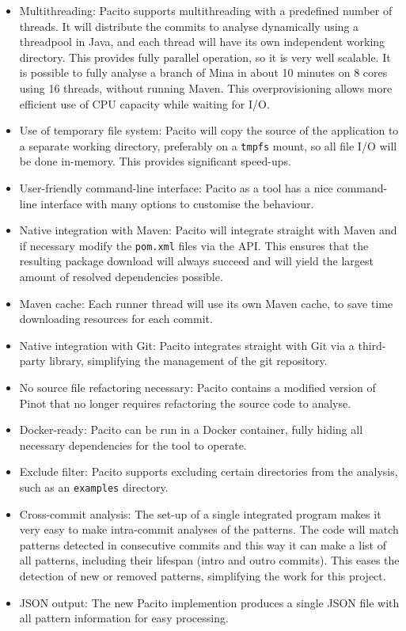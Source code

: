 \begin{itemize}
    \item Multithreading: Pacito supports multithreading with a predefined number of threads. It will distribute the commits to analyse dynamically using a threadpool in Java, and each thread will have its own independent working directory. This provides fully parallel operation, so it is very well scalable. It is possible to fully analyse a branch of Mina in about 10 minutes on 8 cores using 16 threads, without running Maven. This overprovisioning allows more efficient use of CPU capacity while waiting for I/O.
    \item Use of temporary file system: Pacito will copy the source of the application to a separate working directory, preferably on a {\tt tmpfs} mount, so all file I/O will be done in-memory. This provides significant speed-ups.
    \item User-friendly command-line interface: Pacito as a tool has a nice command-line interface with many options to customise the behaviour.
    \item Native integration with Maven: Pacito will integrate straight with Maven and if necessary modify the {\tt pom.xml} files via the API. This ensures that the resulting package download will always succeed and will yield the largest amount of resolved dependencies possible.
    \item Maven cache: Each runner thread will use its own Maven cache, to save time downloading resources for each commit.
    \item Native integration with Git: Pacito integrates straight with Git via a third-party library, simplifying the management of the git repository.
    \item No source file refactoring necessary: Pacito contains a modified version of Pinot that no longer requires refactoring the source code to analyse.
    \item Docker-ready: Pacito can be run in a Docker container, fully hiding all necessary dependencies for the tool to operate.
    \item Exclude filter: Pacito supports excluding certain directories from the analysis, such as an {\tt examples} directory.
    \item Cross-commit analysis: The set-up of a single integrated program makes it very easy to make intra-commit analyses of the patterns. The code will match patterns detected in consecutive commits and this way it can make a list of all patterns, including their lifespan (intro and outro commits). This eases the detection of new or removed patterns, simplifying the work for this project.
    \item JSON output: The new Pacito implemention produces a single JSON file with all pattern information for easy processing.
\end{itemize}

